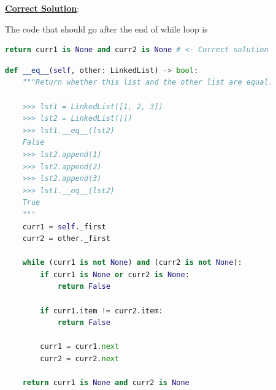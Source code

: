 \documentclass[12pt]{article}
\begin{document}
\begin{enumerate}[a.]
    \newpage

    \begin{mdframed}
        \underline{\textbf{Correct Solution}}:

        \bigskip

        The code that should go after the end of while loop is

        \begin{lstlisting}[language=Python]
        return curr1 is None and curr2 is None # <- Correct solution
        \end{lstlisting}
    \end{mdframed}

\end{enumerate}

\bigskip

\begin{lstlisting}[language=Python,caption={worksheet\_13\_q1\_solution.py},captionpos=b]
def __eq__(self, other: LinkedList) -> bool:
    """Return whether this list and the other list are equal.

    >>> lst1 = LinkedList([1, 2, 3])
    >>> lst2 = LinkedList([])
    >>> lst1.__eq__(lst2)
    False
    >>> lst2.append(1)
    >>> lst2.append(2)
    >>> lst2.append(3)
    >>> lst1.__eq__(lst2)
    True
    """
    curr1 = self._first
    curr2 = other._first

    while (curr1 is not None) and (curr2 is not None):
        if curr1 is None or curr2 is None:
            return False

        if curr1.item != curr2.item:
            return False

        curr1 = curr1.next
        curr2 = curr2.next

    return curr1 is None and curr2 is None
\end{lstlisting}
\end{document}
